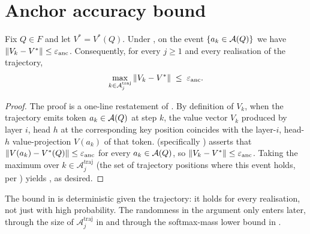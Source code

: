 \section{Anchor accuracy bound}
\label{sec:anchor_accuracy}

\begin{lemma}\label{lem:anchor_accuracy_bound}
Fix $Q \in F$ and let $V^* = V^*(Q)$. Under ,
on the event $\{a_k \in \mathcal{A}(Q)\}$ we have $\left\| V_k - V^* \right\| \le \varepsilon_{\mathrm{anc}}$.
Consequently, for every $j \ge 1$ and every realisation of the trajectory,
\begin{align}\label{eq:anchor_accuracy_bound_eq}
   \max_{k \in \mathcal A^{\mathrm{traj}}_j} \left\| V_k - V^* \right\|
   \;\le\; \varepsilon_{\mathrm{anc}}.
\end{align}
\end{lemma}

\begin{proof}
The proof is a one-line restatement of .
By definition of $V_k$, when the trajectory emits token
$a_k \in \mathcal{A}(Q)$ at step $k$, the value vector $V_k$ produced by layer
$i$, head $h$ at the corresponding key position coincides with the
layer-$i$, head-$h$ value-projection $V(a_k)$ of that token.
 (specifically
) asserts that
$\left\| V(a_k) - V^*(Q) \right\| \le \varepsilon_{\mathrm{anc}}$ for every
$a_k \in \mathcal{A}(Q)$, so $\left\| V_k - V^* \right\| \le \varepsilon_{\mathrm{anc}}$.
Taking the maximum over $k \in \mathcal A^{\mathrm{traj}}_j$
(the set of trajectory positions where this event holds, per
) yields ,
as desired.
\end{proof}

\begin{remark}\label{rem:anchor_accuracy_bound_remark}
The bound in  is deterministic given the
trajectory: it holds for every realisation, not just with high
probability. The randomness in the argument only enters later, through
the size of $\mathcal A^{\mathrm{traj}}_j$ in 
and through the softmax-mass lower bound in .
\end{remark}
